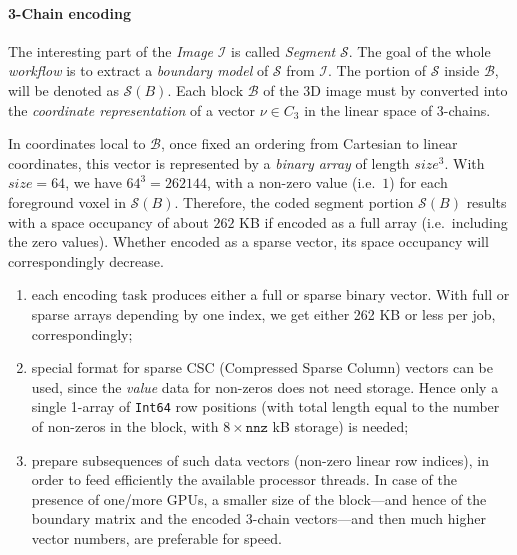 \paragraph{3-Chain encoding}
\label{chain-coding}
The interesting part of the \emph{Image} $\mathcal{I}$ is called \emph{Segment} $\mathcal{S}$. The goal of the whole \emph{workflow} is to extract a \emph{boundary model} of $\mathcal{S}$ from $\mathcal{I}$. The portion of $\mathcal{S}$ inside $\mathcal{B}$, will be denoted as $\mathcal{S}(B)$.
Each block $\mathcal{B}$ of the 3D image must by converted into the \emph{coordinate representation} of a vector $\nu\in C_3$ in the linear space  of 3-chains. 

In coordinates local to $\mathcal{B}$, once fixed an ordering from Cartesian to linear coordinates, this vector is represented by a \emph{binary array} of length $size^3$. With $size=64$, we have $64^3=262144$,  with a non-zero value (i.e.~$1$) for each foreground voxel in $\mathcal{S}(B)$. Therefore, the coded segment portion $\mathcal{S}(B)$ results with a space occupancy of about $262$ KB if encoded as a full array (i.e.~including the zero values). Whether encoded as a sparse vector, its space occupancy will correspondingly decrease.

\begin{enumerate}

\item each encoding task produces either a full or sparse binary vector. With full or sparse arrays depending by one index, we get either 262 KB or less per job, correspondingly;

\item special format for sparse CSC (Compressed Sparse Column) vectors can be used, since the \emph{value} data for non-zeros does not need storage. Hence only a single 1-array of \texttt{Int64} row positions (with total length equal to the number of non-zeros in the block, with $8\times\mathtt{nnz}$ kB storage) is needed;

\item prepare subsequences of such data vectors (non-zero linear row indices), in order to feed efficiently the available processor threads.
In case of the presence of one/more GPUs, a smaller size of the block---and hence of the boundary matrix and the encoded 3-chain vectors---and then much higher vector numbers, are preferable for speed.

\end{enumerate}

